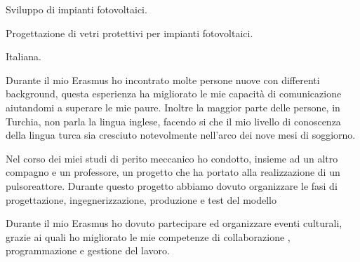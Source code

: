 \documentclass[italian,a4paper]{europasscv}
\begin{document}
\begin{europasscv}
		\ecvitem{} {
			\begin{ecvitemize}
				\item Sviluppo di impianti fotovoltaici.
				\item Progettazione di vetri protettivi per impianti
					fotovoltaici.
			\end{ecvitemize}
		}



		 {
			Italiana.
		}
		\ecvlanguageheader
		\ecvlanguagefooter

		 {
			\begin{ecvitemize}
				\item Durante il mio Erasmus ho incontrato molte persone nuove
					con differenti background, questa esperienza ha migliorato
					le mie capacità di comunicazione aiutandomi a superare le
					mie paure.  Inoltre la maggior parte delle persone, in
					Turchia, non parla la lingua inglese, facendo si che il
					mio livello di conoscenza della lingua turca sia cresciuto
					notevolmente nell'arco dei nove mesi di soggiorno.
			\end{ecvitemize}
		}

		 {
		\begin{ecvitemize}
			\item Nel corso dei miei studi di perito meccanico ho condotto,
				insieme ad un altro compagno e un professore, un progetto che
				ha portato alla realizzazione di un pulsoreattore. Durante
				questo progetto abbiamo dovuto organizzare le fasi di
				progettazione, ingegnerizzazione, produzione e test del modello
			\item Durante il mio Erasmus ho dovuto partecipare ed organizzare
				eventi culturali, grazie ai quali ho migliorato le mie
				competenze di collaborazione , programmazione e gestione del
				lavoro.
		\end{ecvitemize}
		}


\end{europasscv}
\end{document}
